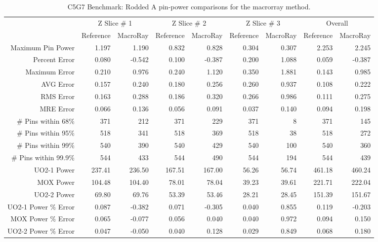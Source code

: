 {{{{        \begin{table}[htbp]
          \centering
          \caption{C5G7 Benchmark: Rodded A pin-power comparisons for the macrorray method. \label{tab:MR:C5G7:Rodded A-MacroRay}}
          \scriptsize
          \begin{tabular}{rrrrrrrrr}\toprule
                                  & \multicolumn{2}{c}{Z Slice \# 1} & \multicolumn{2}{c}{Z Slice \# 2} & \multicolumn{2}{c}{Z Slice \# 3} & \multicolumn{2}{c}{Overall}\\
                                  & Reference & MacroRay & Reference & MacroRay & Reference & MacroRay & Reference & MacroRay\\\midrule
            Maximum Pin Power     & 1.197 & 1.190 & 0.832 & 0.828 & 0.304 & 0.307 & 2.253 & 2.245\\
            Percent Error         & 0.080 & -0.542 & 0.100 & -0.387 & 0.200 & 1.088 & 0.059 & -0.387\\\midrule
            Maximum Error         & 0.210 & 0.976 & 0.240 & 1.120 & 0.350 & 1.881 & 0.143 & 0.985\\
            AVG Error             & 0.157 & 0.240 & 0.180 & 0.256 & 0.260 & 0.937 & 0.108 & 0.222\\
            RMS Error             & 0.163 & 0.288 & 0.186 & 0.320 & 0.266 & 0.986 & 0.111 & 0.275\\
            MRE Error             & 0.066 & 0.136 & 0.056 & 0.091 & 0.037 & 0.140 & 0.094 & 0.198\\\midrule
            \# Pins within 68\%   & 371 & 212 & 371 & 229 & 371 & 8 & 371 & 145\\
            \# Pins within 95\%   & 518 & 341 & 518 & 369 & 518 & 38 & 518 & 272\\
            \# Pins within 99\%   & 540 & 390 & 540 & 429 & 540 & 100 & 540 & 360\\
            \# Pins within 99.9\% & 544 & 433 & 544 & 490 & 544 & 194 & 544 & 439\\\midrule
            UO2-1 Power           & 237.41 & 236.50 & 167.51 & 167.00 & 56.26 & 56.74 & 461.18 & 460.24\\
            MOX Power             & 104.48 & 104.40 & 78.01 & 78.04 & 39.23 & 39.61 & 221.71 & 222.04\\
            UO2-2 Power           & 69.80 & 69.76 & 53.39 & 53.46 & 28.21 & 28.45 & 151.39 & 151.67\\
            UO2-1 Power \% Error  & 0.087 & -0.382 & 0.071 & -0.305 & 0.040 & 0.855 & 0.119 & -0.203\\
            MOX Power \% Error    & 0.065 & -0.077 & 0.056 & 0.040 & 0.040 & 0.972 & 0.094 & 0.150\\
            UO2-2 Power \% Error  & 0.047 & -0.050 & 0.040 & 0.128 & 0.029 & 0.849 & 0.068 & 0.180\\\bottomrule
          \end{tabular}
        \end{table}

}}}}
